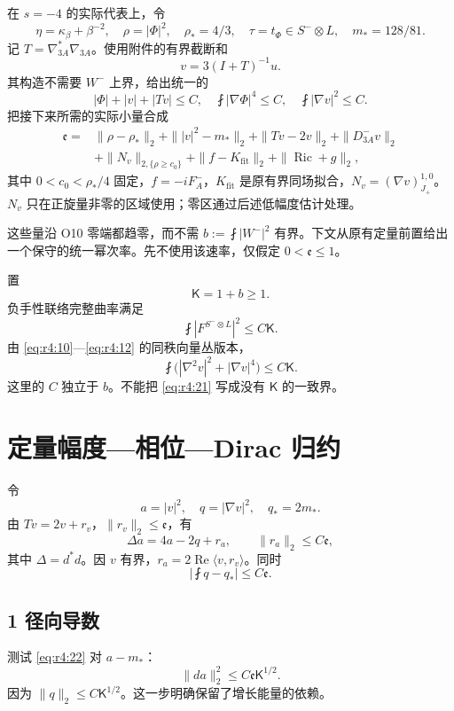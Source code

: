\documentclass[UTF8,11pt,openany,oneside,fontset=none]{ctexbook}
\begin{document}
在 \(s=-4\) 的实际代表上，令 \[
\eta=\kappa_\beta+\beta^{-2},\quad
\rho=|\Phi|^2,\quad\rho_*=4/3,\quad
\tau=t_\Phi\in S^-\otimes L,\quad m_*=128/81.
\] 记 \(T=\nabla_{3A}^*\nabla_{3A}\)。使用附件的有界截断和 \[
v=3(I+T)^{-1}u.
\tag{4.18}\label{eq:r4:18}
\] 其构造不需要 \(W^-\) 上界，给出统一的 \[
|\Phi|+|v|+|Tv|\le C,\quad
\fint|\nabla\Phi|^4\le C,\quad
\fint|\nabla v|^2\le C.
\tag{4.19}\label{eq:r4:19}
\] 把接下来所需的实际小量合成 \[
\begin{aligned}
\mathfrak e={}&
\|\rho-\rho_*\|_2+
\||v|^2-m_*\|_2+
\|Tv-2v\|_2+
\|D^-_{3A}v\|_2\\
&+\|N_v\|_{2,\{\rho\ge c_0\}}
+\|f-K_{\mathrm{fit}}\|_2
+\|\operatorname{Ric}+g\|_2,
\end{aligned}
\tag{4.20}\label{eq:r4:20}
\] 其中 \(0<c_0<\rho_*/4\) 固定，\(f=-iF_A^-\)，\(K_{\mathrm{fit}}\) 是原有界同场拟合，\(N_v=(\nabla v)^{1,0}_{J_+}\)。\(N_v\) 只在正旋量非零的区域使用；零区通过后述低幅度估计处理。

这些量沿 O10 零端都趋零，而不需 \(b:=\fint|W^-|^2\) 有界。下文从原有定量前置给出一个保守的统一幂次率。先不使用该速率，仅假定 \(0<\mathfrak e\le1\)。

置 \[
\mathsf K=1+b\ge1.
\] 负手性联络完整曲率满足 \[
\fint|F^{S^-\otimes L}|^2\le C\mathsf K.
\] 由 \eqref{eq:r4:10}---\eqref{eq:r4:12} 的同秩向量丛版本， \[
\boxed{
\fint\bigl(|\nabla^2v|^2+|\nabla v|^4\bigr)\le C\mathsf K.
}
\tag{4.21}\label{eq:r4:21}
\] 这里的 \(C\) 独立于 \(b\)。不能把 \eqref{eq:r4:21} 写成没有 \(\mathsf K\) 的一致界。

\section{定量幅度---相位---Dirac 归约}\label{ch4:ux5b9aux91cfux5e45ux5ea6ux76f8ux4f4ddirac-ux5f52ux7ea6}

令 \[
a=|v|^2,\quad q=|\nabla v|^2,\quad q_*=2m_*.
\] 由 \(Tv=2v+r_v\)，\(\|r_v\|_2\le\mathfrak e\)，有 \[
\Delta a=4a-2q+r_a,\qquad
\|r_a\|_2\le C\mathfrak e,
\tag{4.22}\label{eq:r4:22}
\] 其中 \(\Delta=d^*d\)。因 \(v\) 有界，\(r_a=2\operatorname{Re}\langle v,r_v\rangle\)。同时 \[
\left|\fint q-q_*\right|\le C\mathfrak e.
\tag{4.23}\label{eq:r4:23}
\]

\subsection{1 径向导数}\label{ch4:ux5f84ux5411ux5bfcux6570}

测试 \eqref{eq:r4:22} 对 \(a-m_*\)： \[
\boxed{
\|da\|_2^2\le C\mathfrak e\mathsf K^{1/2}.
}
\tag{4.24}\label{eq:r4:24}
\] 因为 \(\|q\|_2\le C\mathsf K^{1/2}\)。这一步明确保留了增长能量的依赖。
\end{document}
